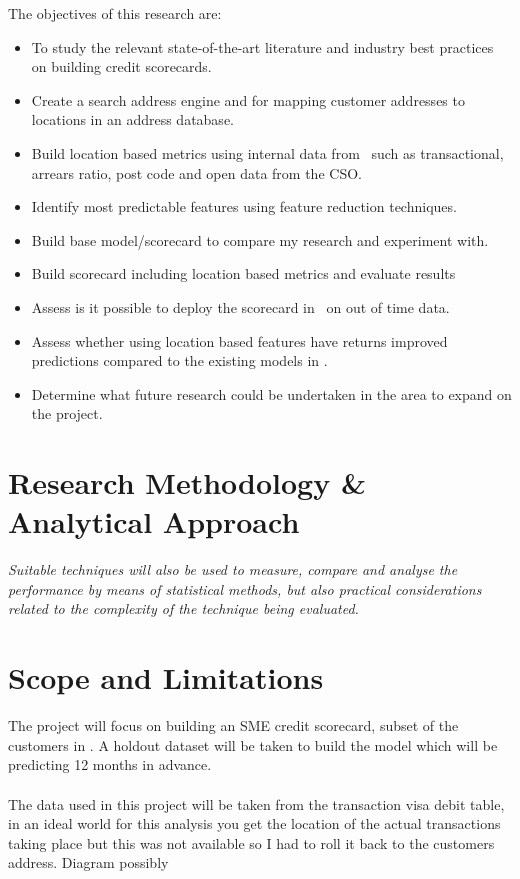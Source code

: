 The objectives of this research are:

\begin{itemize}
	\item To study the relevant state-of-the-art literature and industry best practices on building credit scorecards.
	\item Create a search address engine and for mapping customer addresses to locations in an address database.
	\item Build location based metrics using internal data from \subjectname\ such as transactional, arrears ratio, post code and open data from the CSO.
	\item Identify most predictable features using feature reduction techniques.
	\item Build base model/scorecard to compare my research and experiment with.
	\item Build scorecard including location based metrics and evaluate results
	\item Assess is it possible to deploy the scorecard in \subjectname\ on out of time data.
	\item Assess whether using location based features have returns improved predictions compared to the existing models in \subjectname.
	\item Determine what future research could be undertaken in the area to expand on the project.
\end{itemize}
	

\section{Research Methodology \& Analytical Approach}
\textit{Suitable techniques will also be used to measure, compare and analyse the performance by means of statistical methods, but also practical considerations related to the complexity of the technique being evaluated.}


\section{Scope and Limitations}
The project will focus on building an SME credit scorecard, subset of the customers in \subjectname. A holdout dataset will be taken to build the model which will be predicting 12 months in advance.
\\\\
The data used in this project will be taken from the transaction visa debit table, in an ideal world for this analysis you get the location of the actual transactions taking place but this was not available so I had to roll it back to the customers address. Diagram possibly
\\\\ 


